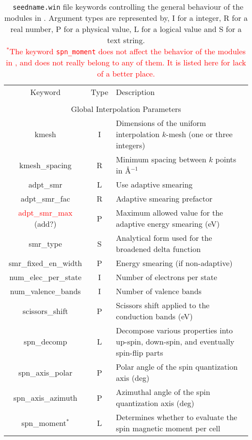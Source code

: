 \begin{table}[hH!]
\begin{center}
\begin{tabular}{|c|c|p{6cm}|}
  \hline
  Keyword & Type & Description \\
  &      &             \\
  \hline\hline
  \multicolumn{3}{|c|}{Global Interpolation Parameters} \\
  \hline
  {\sc kmesh}   & I & Dimensions of the uniform interpolation $k$-mesh 
(one or three integers) \\
  {\sc kmesh\_spacing}& R & Minimum spacing between $k$ points in \AA$^{-1}$\\
  {\sc adpt\_smr}   & L & Use adaptive smearing\\
  {\sc adpt\_smr\_fac}   & R & Adaptive smearing prefactor\\
  {\sc \textcolor{red}{adpt\_smr\_max} (add?)} & P & Maximum allowed value for the adaptive energy smearing (eV) \\  {\sc smr\_type}   & S &  Analytical form used for the broadened delta function\\
  {\sc smr\_fixed\_en\_width}   & P & Energy smearing (if non-adaptive)\\
  {\sc num\_elec\_per\_state}   & I & Number of electrons per state \\
  {\sc num\_valence\_bands}   & I & Number of valence bands \\
  {\sc scissors\_shift}   & P & Scissors shift applied to the conduction bands (eV) \\
  {\sc spn\_decomp}& L & Decompose various properties into
  up-spin, down-spin, and eventually spin-flip parts\\
  {\sc spn\_axis\_polar}& P & Polar angle of the spin quantization axis (deg)\\
  {\sc spn\_axis\_azimuth}& P & Azimuthal angle of the spin quantization axis (deg)\\
  {\sc spn\_moment}$^*$& L & Determines whether to evaluate the spin 
magnetic moment per cell\\  \hline
\end{tabular}
\caption[Parameter file keywords controlling \postw.]  {{\tt
    seedname.win} file keywords controlling the general behaviour of
  the modules in \postw. Argument types are represented by, I for a
  integer, R for a real number, P for a
  physical value, L for a logical value and S for a text string.\\
  \textcolor{red}{$^*$The keyword {\tt spn\_moment} does not affect
    the behavior of the modules in \postw, and does not really belong
    to any of them. It is listed here for lack of a better place.}}
\label{parameter_keywords_postw90}
\end{center}
\end{table}


